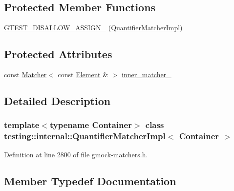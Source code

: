 \subsection*{Protected Member Functions}
\begin{DoxyCompactItemize}
\item 
\hyperlink{classtesting_1_1internal_1_1QuantifierMatcherImpl_ad57fcd1799e59217fe40c0144ff024f1}{G\+T\+E\+S\+T\+\_\+\+D\+I\+S\+A\+L\+L\+O\+W\+\_\+\+A\+S\+S\+I\+G\+N\+\_\+} (\hyperlink{classtesting_1_1internal_1_1QuantifierMatcherImpl}{Quantifier\+Matcher\+Impl})
\end{DoxyCompactItemize}
\subsection*{Protected Attributes}
\begin{DoxyCompactItemize}
\item 
const \hyperlink{classtesting_1_1Matcher}{Matcher}$<$ const \hyperlink{classtesting_1_1internal_1_1QuantifierMatcherImpl_a6f73e2e5fa853f8b5fdd33d6a1811f9e}{Element} \& $>$ \hyperlink{classtesting_1_1internal_1_1QuantifierMatcherImpl_af0ee2a4697f5cb8e937fd29dd75e2a30}{inner\+\_\+matcher\+\_\+}
\end{DoxyCompactItemize}


\subsection{Detailed Description}
\subsubsection*{template$<$typename Container$>$\newline
class testing\+::internal\+::\+Quantifier\+Matcher\+Impl$<$ Container $>$}



Definition at line 2800 of file gmock-\/matchers.\+h.



\subsection{Member Typedef Documentation}
\mbox{\label{classtesting_1_1internal_1_1QuantifierMatcherImpl_a6f73e2e5fa853f8b5fdd33d6a1811f9e}} 
